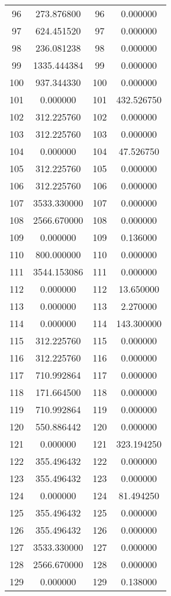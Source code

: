 \documentclass[12pt]{article}
\begin{document}
\begin{longtable}{@{}cccc@{}}
96 & 273.876800 & 96 & 0.000000 \\
97 & 624.451520 & 97 & 0.000000 \\
98 & 236.081238 & 98 & 0.000000 \\
99 & 1335.444384 & 99 & 0.000000 \\
100 & 937.344330 & 100 & 0.000000 \\
101 & 0.000000 & 101 & 432.526750 \\
102 & 312.225760 & 102 & 0.000000 \\
103 & 312.225760 & 103 & 0.000000 \\
104 & 0.000000 & 104 & 47.526750 \\
105 & 312.225760 & 105 & 0.000000 \\
106 & 312.225760 & 106 & 0.000000 \\
107 & 3533.330000 & 107 & 0.000000 \\
108 & 2566.670000 & 108 & 0.000000 \\
109 & 0.000000 & 109 & 0.136000 \\
110 & 800.000000 & 110 & 0.000000 \\
111 & 3544.153086 & 111 & 0.000000 \\
112 & 0.000000 & 112 & 13.650000 \\
113 & 0.000000 & 113 & 2.270000 \\
114 & 0.000000 & 114 & 143.300000 \\
115 & 312.225760 & 115 & 0.000000 \\
116 & 312.225760 & 116 & 0.000000 \\
117 & 710.992864 & 117 & 0.000000 \\
118 & 171.664500 & 118 & 0.000000 \\
119 & 710.992864 & 119 & 0.000000 \\
120 & 550.886442 & 120 & 0.000000 \\
121 & 0.000000 & 121 & 323.194250 \\
122 & 355.496432 & 122 & 0.000000 \\
123 & 355.496432 & 123 & 0.000000 \\
124 & 0.000000 & 124 & 81.494250 \\
125 & 355.496432 & 125 & 0.000000 \\
126 & 355.496432 & 126 & 0.000000 \\
127 & 3533.330000 & 127 & 0.000000 \\
128 & 2566.670000 & 128 & 0.000000 \\
129 & 0.000000 & 129 & 0.138000 \\

\end{longtable}
\end{document}

